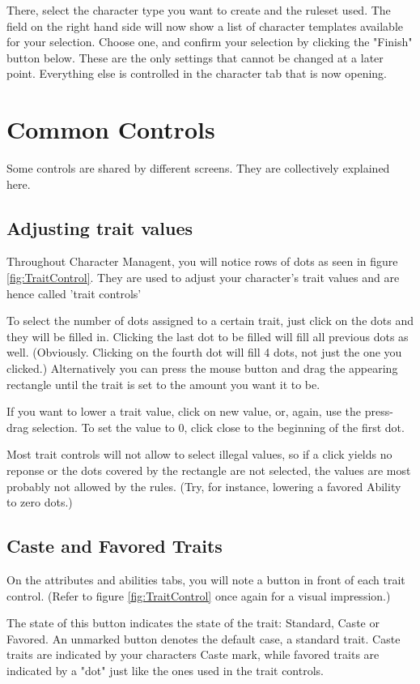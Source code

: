 There, select the character type you want to create and the ruleset used. The field on the right hand side will now show a list of character templates available for your selection. Choose one, and confirm your selection by clicking the "Finish" button below. These are the only settings that cannot be changed at a later point. Everything else is controlled in the character tab that is now opening.

\section{Common Controls}
Some controls are shared by different screens. They are collectively explained here.

\subsection{Adjusting trait values}
Throughout Character Managent, you will notice rows of dots as seen in figure \ref{fig:TraitControl}. They are used to adjust your character's trait values and are hence called 'trait controls'

To select the number of dots assigned to a certain trait, just click on the dots and they will be filled in. Clicking the last dot to be filled will fill all previous dots as well. (Obviously. Clicking on the fourth dot will fill 4 dots, not just the one you clicked.) Alternatively you can press the mouse button and drag the appearing rectangle until the trait is set to the amount you want it to be. 

If you want to lower a trait value, click on new value, or, again, use the press-drag selection. To set the value to 0, click close to the beginning of the first dot. 

Most trait controls will not allow to select illegal values, so if a click yields no reponse or the dots covered by the rectangle are not selected, the values are most probably not allowed by the rules. (Try, for instance, lowering a favored Ability to zero dots.)

\subsection{Caste and Favored Traits}
On the attributes and abilities tabs, you will note a button in front of each trait control. (Refer to figure \ref{fig:TraitControl} once again for a visual impression.)

The state of this button indicates the state of the trait: Standard, Caste or Favored. An unmarked button denotes the default case, a standard trait. Caste traits are indicated by your characters Caste mark, while favored traits are indicated by a "dot" just like the ones used in the trait controls.

